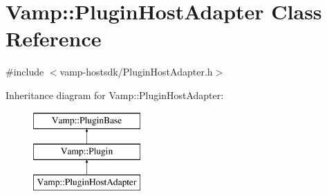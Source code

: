 \hypertarget{class_vamp_1_1_plugin_host_adapter}{}\section{Vamp\+:\+:Plugin\+Host\+Adapter Class Reference}
\label{class_vamp_1_1_plugin_host_adapter}


{\ttfamily \#include $<$vamp-\/hostsdk/\+Plugin\+Host\+Adapter.\+h$>$}

Inheritance diagram for Vamp\+:\+:Plugin\+Host\+Adapter\+:\begin{figure}[H]
\begin{center}
\leavevmode
\includegraphics[height=3.000000cm]{class_vamp_1_1_plugin_host_adapter}
\end{center}
\end{figure}
